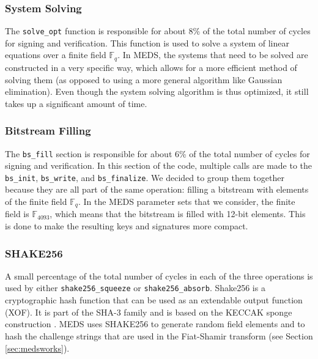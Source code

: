 \documentclass[11pt,a4paper]{report}
\theoremstyle{definition}
\begin{document}
\subsubsection{System Solving}
The \texttt{solve\_opt} function is responsible for about 8\% of the total number of cycles for signing and verification. This function is used to solve a system of linear equations over a finite field $\mathbb{F}_q$. In MEDS, the systems that need to be solved are constructed in a very specific way, which allows for a more efficient method of solving them (as opposed to using a more general algorithm like Gaussian elimination). Even though the system solving algorithm is thus optimized, it still takes up a significant amount of time.

\subsubsection{Bitstream Filling}
The \texttt{bs\_fill} section is responsible for about 6\% of the total number of cycles for signing and verification. In this section of the code, multiple calls are made to the \texttt{bs\_init}, \texttt{bs\_write}, and \texttt{bs\_finalize}. We decided to group them together because they are all part of the same operation: filling a bitstream with elements of the finite field $\mathbb{F}_q$. In the MEDS parameter sets that we consider, the finite field is $\mathbb{F}_{4093}$, which means that the bitstream is filled with 12-bit elements. This is done to make the resulting keys and signatures more compact.

\subsubsection{SHAKE256}
\label{sec:shake256}
A small percentage of the total number of cycles in each of the three operations is used by either \texttt{shake256\_squeeze} or \texttt{shake256\_absorb}. Shake256 is a cryptographic hash function that can be used as an extendable output function (XOF). It is part of the SHA-3 family \cite{dworkin2015sha} and is based on the KECCAK sponge construction \cite{bertoni2013keccak}. MEDS uses SHAKE256 to generate random field elements and to hash the challenge strings that are used in the Fiat-Shamir transform (see Section \ref{sec:medsworks}).
\end{document}
